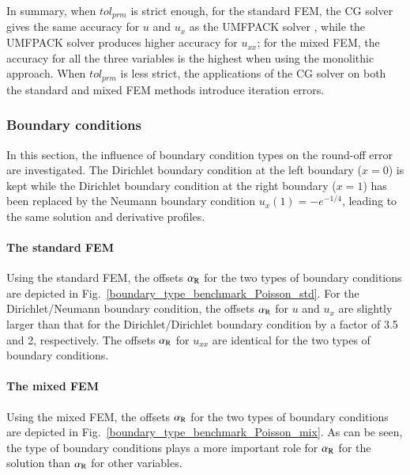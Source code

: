 \documentclass[review,3p]{elsarticle}
\begin{document}
In summary, when $tol_{prm}$ is strict enough, for the standard FEM, the CG solver gives the same accuracy for $u$ and $u_{x}$ as the UMFPACK solver , while the UMFPACK solver produces higher accuracy for $u_{xx}$; for the mixed FEM, the accuracy for all the three variables is the highest when using the monolithic approach. When $tol_{prm}$ is less strict, the applications of the CG solver on both the standard and mixed FEM methods introduce iteration errors.

\subsubsection{Boundary conditions}	\label{section_BC}

In this section, the influence of boundary condition types on the round-off error are investigated.
The Dirichlet boundary condition at the left boundary ($x=0$) is kept while the Dirichlet boundary condition at the right boundary ($x=1$) has been replaced by the Neumann boundary condition $u_x (1) = -e^{-1/4}$, leading to the same solution and derivative profiles. 


\paragraph{The standard FEM}
Using the standard FEM, the offsets $\alpha_{\rm R}$ for the two types of boundary conditions are depicted in Fig.~\ref{boundary_type_benchmark_Poisson_std}. 
For the Dirichlet/Neumann boundary condition, the offsets $\alpha_{\rm R}$ for $u$ and $u_x$ are slightly larger than that for the Dirichlet/Dirichlet boundary condition by a factor of 3.5 and 2, respectively. The offsets $\alpha_{\rm R}$ for $u_{xx}$ are identical for the two types of boundary conditions.

\paragraph{The mixed FEM}
Using the mixed FEM, the offsets $\alpha_{\rm R}$ for the two types of boundary conditions are depicted in Fig.~\ref{boundary_type_benchmark_Poisson_mix}.
As can be seen, the type of boundary conditions plays a more important role for $\alpha_{\rm R}$ for the solution than $\alpha_{\rm R}$ for other variables.
\end{document}
